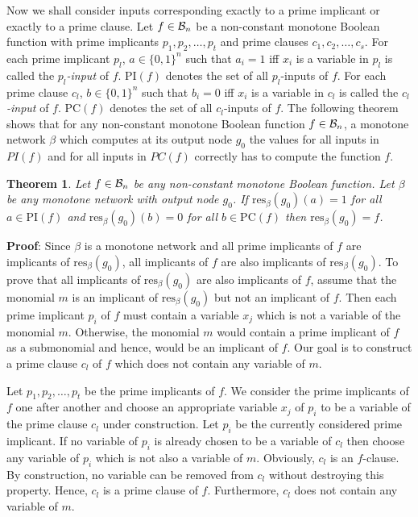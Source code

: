 \documentclass[11pt]{article}
\newtheorem{theo}{Theorem}
\begin{document}
Now we shall consider inputs corresponding exactly to a prime implicant or exactly to a prime clause.
Let $f \in {\cal B}_n$ be a non-constant monotone Boolean function with prime implicants $p_1,p_2, \ldots,p_t$
and prime clauses $c_1,c_2, \ldots,c_s$. For each prime implicant $p_l$, $a \in \{0,1\}^n$ such that
$a_i = 1$ iff $x_i$ is a variable in $p_l$ is called the {\em $p_l$-input\/} of $f$.
$\mbox{PI}(f)$ denotes the set of all $p_l$-inputs of $f$. For each prime clause $c_l$, $b \in \{0,1\}^n$ such that
$b_i = 0$ iff $x_i$ is a variable in $c_l$ is called the {\em $c_l$-input\/} of $f$.
$\mbox{PC}(f)$ denotes the set of all $c_l$-inputs of $f$.
The following theorem shows that for any non-constant monotone Boolean function $f \in {\cal B}_n$, a monotone
network $\beta$ which computes at its output node $g_0$ the values for all inputs in $PI(f)$ and for all inputs in
$PC(f)$ correctly has to compute the function $f$.
\begin{theo} \label{theo2.2}
  Let $f \in {\cal B}_n$ be any non-constant monotone Boolean function. Let $\beta$ be any monotone network
  with output node $g_0$. If $\mbox{res}_{\beta}(g_0)(a) = 1$ for all $a \in \mbox{PI}(f)$ and
  $\mbox{res}_{\beta}(g_0)(b) = 0$ for all $b \in \mbox{PC}(f)$ then $\mbox{res}_{\beta}(g_0) = f$.
\end{theo}
{\bf Proof}:
Since $\beta$ is a monotone network and all prime implicants of $f$ are implicants of $\mbox{res}_{\beta}(g_0)$, all
implicants of $f$ are also implicants of $\mbox{res}_{\beta}(g_0)$. To prove that all implicants of
$\mbox{res}_{\beta}(g_0)$ are also implicants of $f$, assume that the monomial $m$ is an implicant of
$\mbox{res}_{\beta}(g_0)$ but not an implicant of $f$. Then each prime implicant $p_i$ of $f$ must contain a variable
$x_j$ which is not a variable of the monomial $m$. Otherwise, the monomial $m$ would contain a prime implicant of
$f$ as a submonomial and hence, would be an implicant of $f$.
Our goal is to construct a prime clause $c_l$ of $f$ which does not contain any variable of $m$.

Let $p_1,p_2, \ldots,p_t$ be the prime implicants of $f$. We consider the prime implicants of $f$ one after another
and choose an appropriate variable $x_j$ of $p_i$ to be a variable of the prime clause $c_l$ under construction. Let
$p_i$ be the currently considered prime implicant. If no variable of $p_i$ is already chosen to be a variable of
$c_l$ then choose any variable of $p_i$ which is not also a variable of $m$.
Obviously, $c_l$ is an $f$-clause.
By construction, no variable can be removed from $c_l$ without destroying this property. Hence, $c_l$ is a
prime clause of $f$. Furthermore, $c_l$ does not contain any variable of $m$.
\end{document}
